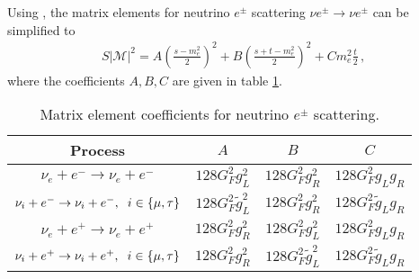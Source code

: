 Using , the matrix elements for neutrino $e^\pm$ scattering $\nu e^\pm\rightarrow \nu e^\pm$ can be simplified to
\begin{align}
S|\mathcal{M}|^2=A\left(\frac{s-m_e^2}{2}\right)^2+B\left(\frac{s+t-m_e^2}{2}\right)^2+Cm_e^2\frac{t}{2}\,,
\end{align}
 where the coefficients $A,B,C$ are given in table \ref{table:nu:e:coeff}.

\begin{table}[ht]
\centering 
\begin{tabular}{|c|c|c|c|}
\hline
Process &$A$&$B$&$C$  \\
\hline
$\nu_e+e^-\rightarrow \nu_e+e^-$&$128G_F^2g_L^2$&$128G_F^2g_R^2$&$128G_F^2g_Lg_R$\\
\hline
$\nu_i+e^-\rightarrow \nu_i+e^-,\hspace{2mm} i\in\{\mu,\tau\}$&$128G_F^2\tilde g_L^2$&$128G_F^2g_R^2$&$128G_F^2\tilde g_Lg_R$\\
\hline
$\nu_e+e^+\rightarrow \nu_e+e^+$&$128G_F^2g_R^2$&$128G_F^2g_L^2$&$128G_F^2g_Lg_R$\\
\hline
$\nu_i+e^+\rightarrow \nu_i+e^+,\hspace{2mm} i\in\{\mu,\tau\}$&$128G_F^2 g_R^2$&$128G_F^2\tilde g_L^2$&$128G_F^2\tilde g_Lg_R$\\
\hline
\end{tabular}
\caption{Matrix element coefficients for neutrino $e^\pm$ scattering.}
\label{table:nu:e:coeff}
\end{table}



